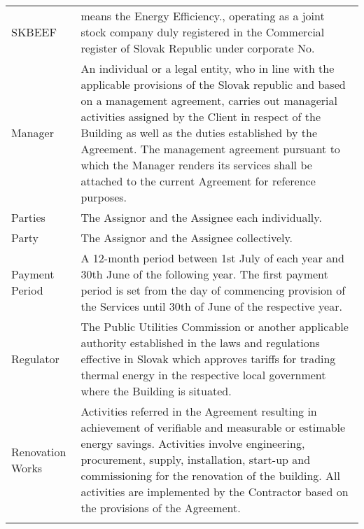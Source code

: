 \documentclass[a4paper]{article}
\begin{document}
\begin{longtabu}{|X|X[2]|}
   \hline

   SKBEEF & means the Energy Efficiency., operating as a joint stock company duly registered 
   in the Commercial register of Slovak Republic under corporate No.\\\tabucline{}

   \hline

   Manager & An individual or a legal entity, who in line with the applicable provisions of 
   the Slovak republic and based on a management agreement, carries out managerial activities
   assigned by the Client in respect of the Building as well as the duties established by the
   Agreement. The management agreement pursuant to which the Manager renders its services shall
   be attached to the current Agreement for reference purposes.\\\tabucline{}

   \hline

   Parties & The Assignor and the Assignee each individually.\\\tabucline{}

   \hline

   Party & The Assignor and the Assignee collectively.\\\tabucline{}

   \hline

   Payment Period & A 12{-}month period between 1st July of each year
   and 30th June of the following year. The first payment period is set
   from the day of commencing provision of the Services until 30th of
   June of the respective year. \\\tabucline{}

   \hline

   Regulator & The Public Utilities Commission or another applicable
   authority established in the laws and regulations effective in
   Slovak which approves tariffs for trading thermal energy in the
   respective local government where the Building is situated.\\\tabucline{}

   \hline

   Renovation Works & Activities referred in the Agreement resulting in
   achievement of verifiable and measurable or estimable energy
   savings. Activities involve engineering, procurement, supply,
   installation, start{-}up and commissioning for the renovation of the
   building. All activities are implemented by the Contractor based on
   the provisions of the Agreement.\\\tabucline{}


\end{longtabu}
\end{document}
